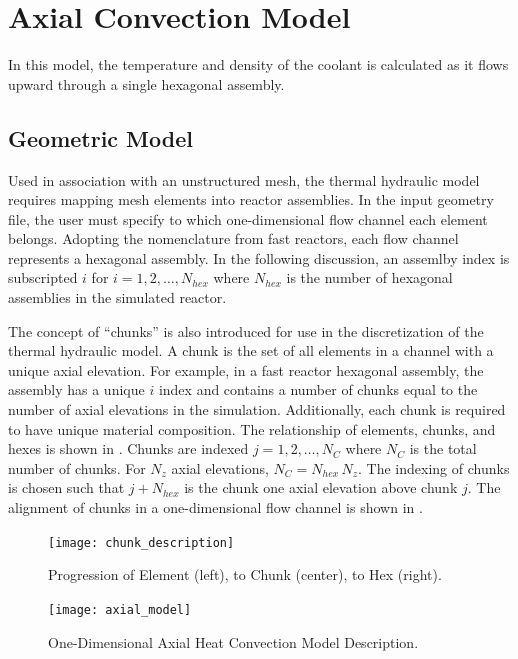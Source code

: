 \section{Axial Convection Model}
  \label{sec:axial_convection_model}
  In this model, the temperature and density of the coolant is calculated as
  it flows upward through a single hexagonal assembly.

  \subsection{Geometric Model}
    Used in association with an unstructured mesh, the thermal hydraulic model
    requires mapping mesh elements into reactor assemblies. In the input
    geometry file, the user must specify to which one-dimensional flow channel 
    each element belongs.
    Adopting the nomenclature from fast reactors, each flow channel represents a
    hexagonal assembly. In the following discussion, an assemlby index is
    subscripted $i$ for $i = 1,2,\ldots,N_{hex}$ where $N_{hex}$ is the number
    of hexagonal assemblies in the simulated reactor. 

    The concept of ``chunks'' is also introduced for use in the discretization 
    of the thermal hydraulic model. A chunk is the set of all elements in a 
    channel with a unique axial elevation. For example, in a fast reactor 
    hexagonal assembly, the assembly has a unique $i$ index and contains a 
    number of chunks equal to the number of axial elevations in the simulation. 
    Additionally, each chunk is required to have unique material composition. 
    The relationship of elements, chunks, and hexes is shown in 
    . Chunks are indexed $j = 1,2,\ldots,N_C$ where
    $N_C$ is the total number of chunks.  For $N_z$ axial elevations, 
    $N_C = N_{hex} \, N_z$. The indexing of chunks is chosen such that 
    $j+N_{hex}$ is the chunk one axial elevation above chunk $j$. The alignment
    of chunks in a one-dimensional flow channel is shown in
    .

    \begin{figure}
      \centering
      \texttt{[image: chunk\_description]}
      \caption{Progression of Element (left), to Chunk (center), to Hex 
        (right).}
      \label{fig:chunk_description}
    \end{figure}
    
    \begin{figure}
      \centering
      \texttt{[image: axial\_model]}
      \caption{One-Dimensional Axial Heat Convection Model Description.}
      \label{fig:axial_model}
    \end{figure}

